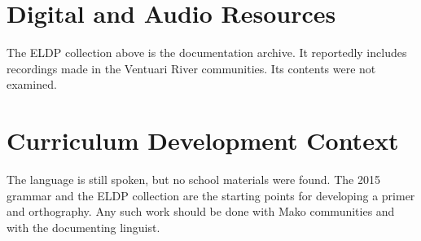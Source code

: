 \documentclass[12pt]{article}
\begin{document}
\section{Digital and Audio Resources}
The ELDP collection above is the documentation archive. It reportedly includes recordings made in the Ventuari River communities. Its contents were not examined.

\section{Curriculum Development Context}
The language is still spoken, but no school materials were found. The 2015 grammar and the ELDP collection are the starting points for developing a primer and orthography. Any such work should be done with Mako communities and with the documenting linguist.
\end{document}
